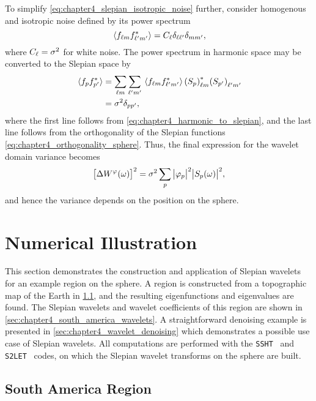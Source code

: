 To simplify \cref{eq:chapter4_slepian_isotropic_noise} further, consider homogenous and isotropic noise defined by its power spectrum
%
\begin{equation}
	\expval*{\harmonic{f} \conj{\harmonic[']{f}}}
	= \powerSpectrum \delta_{\ell\ell'} \delta_{mm'},
\end{equation}
%
where \(\powerSpectrum = \sigma^{2}\) for white noise.
The power spectrum in harmonic space may be converted to the Slepian space by
%
\begin{align}
	\expval*{\slepian{f} \conj{\slepian[']{f}}}
	 & = \harmonicSum \harmonicSum['] \expval*{\harmonic{f} \conj{\harmonic[']{f}}} \conj{\harmonic{(\slepian{S})}} \harmonic[']{(\slepian[']{S})} \nonumber \\
	 & = \sigma^{2} \delta_{pp'},
\end{align}
%
where the first line follows from \cref{eq:chapter4_harmonic_to_slepian}, and the last line follows from the orthogonality of the Slepian functions \cref{eq:chapter4_orthogonality_sphere}.
Thus, the final expression for the wavelet domain variance becomes
%
\begin{equation}\label{eq:chapter4_wavelet_variance}
	\variance{\pixel{W^{\varphi}}}
	= \sigma^{2} \slepianSum \abs{\slepian{\varphi}}^{2} \abs{\pixel{\slepian{S}}}^{2},
\end{equation}
%
and hence the variance depends on the position on the sphere.

\section{Numerical Illustration}\label{sec:chapter4_numerical_illustration}

This section demonstrates the construction and application of Slepian wavelets for an example region on the sphere.
A region is constructed from a topographic map of the Earth in \cref{sec:chapter4_south_america_region}, and the resulting eigenfunctions and eigenvalues are found.
The Slepian wavelets and wavelet coefficients of this region are shown in \cref{sec:chapter4_south_america_wavelets}.
A straightforward denoising example is presented in \cref{sec:chapter4_wavelet_denoising} which demonstrates a possible use case of Slepian wavelets.
All computations are performed with the \texttt{SSHT}~\cite{McEwen2011} and \texttt{S2LET}~\cite{Leistedt2013} codes, on which the Slepian wavelet transforms on the sphere are built.

\subsection{South America Region}\label{sec:chapter4_south_america_region}

